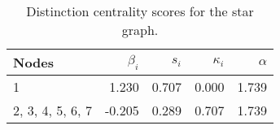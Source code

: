 \begin{table}
\centering
\caption{\label{tab:star}Distinction centrality scores for the star graph.}
\centering
\begin{tabular}[t]{lrrrr}
\toprule
Nodes & $\beta_i$ & $s_i$ & $\kappa_i$ & $\alpha$\\
\midrule
1 & 1.230 & 0.707 & 0.000 & 1.739\\
2, 3, 4, 5, 6, 7 & -0.205 & 0.289 & 0.707 & 1.739\\
\bottomrule
\end{tabular}
\end{table}
